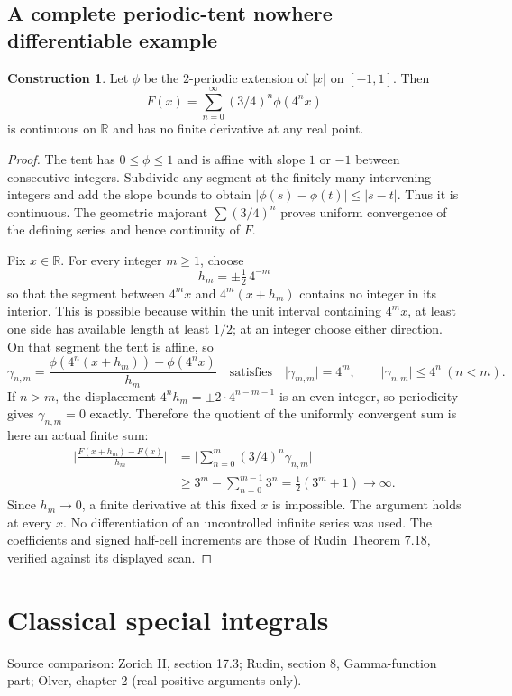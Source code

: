 \documentclass[11pt,oneside,a4paper]{book}
\theoremstyle{definition}
\newtheorem{construction}[theorem]{Construction}
\theoremstyle{remark}
\newcommand{\R}{\mathbb R}
\newcommand{\abs}[1]{\lvert#1\rvert}
\newcommand{\KEntry}[2]{\Needspace{7\baselineskip}\section{#2}\label{#1}{\small\sffamily\color{black!60}\detokenize{#1}}\par}
\newcommand{\SourceRef}[1]{{\small\textsf{Source comparison: #1.}}}
\begin{document}
\KEntry{K03.16.nowhere_differentiable}{A complete periodic-tent nowhere differentiable example}
\begin{construction}
Let $\phi$ be the $2$-periodic extension of $\abs x$ on $[-1,1]$. Then
\[F(x)=\sum_{n=0}^\infty(3/4)^n\phi(4^nx)\]
is continuous on $\R$ and has no finite derivative at any real point.
\end{construction}
\begin{proof}
The tent has $0\leq\phi\leq1$ and is affine with slope $1$ or $-1$ between consecutive integers. Subdivide any segment at the finitely many intervening integers and add the slope bounds to obtain $\abs{\phi(s)-\phi(t)}\leq\abs{s-t}$. Thus it is continuous. The geometric majorant $\sum(3/4)^n$ proves uniform convergence of the defining series and hence continuity of $F$.

Fix $x\in\R$. For every integer $m\geq1$, choose
\[h_m=\pm\tfrac12\,4^{-m}\]
so that the segment between $4^mx$ and $4^m(x+h_m)$ contains no integer in its interior. This is possible because within the unit interval containing $4^mx$, at least one side has available length at least $1/2$; at an integer choose either direction. On that segment the tent is affine, so
\[\gamma_{n,m}=\frac{\phi(4^n(x+h_m))-\phi(4^nx)}{h_m}\quad\text{satisfies}\quad
\abs{\gamma_{m,m}}=4^m,\qquad\abs{\gamma_{n,m}}\leq4^n\ (n<m).\]
If $n>m$, the displacement $4^nh_m=\pm2\cdot4^{n-m-1}$ is an even integer, so periodicity gives $\gamma_{n,m}=0$ exactly. Therefore the quotient of the uniformly convergent sum is here an actual finite sum:
\[\begin{split}
\abs{\frac{F(x+h_m)-F(x)}{h_m}}
&=\abs{\sum_{n=0}^m(3/4)^n\gamma_{n,m}}\\
&\geq3^m-\sum_{n=0}^{m-1}3^n=\tfrac12(3^m+1)\longrightarrow\infty.
\end{split}\]
Since $h_m\to0$, a finite derivative at this fixed $x$ is impossible. The argument holds at every $x$. No differentiation of an uncontrolled infinite series was used. The coefficients and signed half-cell increments are those of Rudin Theorem 7.18, verified against its displayed scan.
\end{proof}



\chapter{Classical special integrals}
\label{module:M03.18}
\SourceRef{Zorich II, section 17.3; Rudin, section 8, Gamma-function part;
Olver, chapter 2 (real positive arguments only)}
\end{document}
